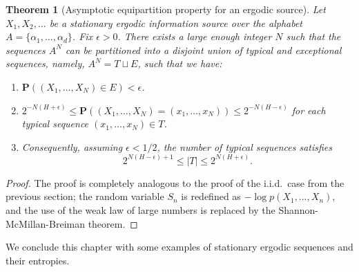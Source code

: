 \documentclass[12pt]{article}
\newtheorem{thm}{Theorem}[section]
\newcommand{\prob}{\mathbf{P}}
\theoremstyle{example}
\begin{document}
\begin{thm}[Asymptotic equipartition property for an ergodic source]
Let $X_1,X_2,\ldots$ be a stationary ergodic information source over the alphabet $A=\{\alpha_1,\ldots,\alpha_d\}$. Fix $\epsilon>0$. There exists a large enough integer $N$ such that the sequences $A^N$ can be partitioned into a disjoint union of typical and exceptional sequences, namely, $A^N = T \sqcup E$, such that we have:
\begin{enumerate}
\item $\prob((X_1,\ldots,X_N) \in E) < \epsilon$.
\item $2^{-N\left(H + \epsilon\right)} \le 
\prob((X_1,\ldots,X_N)=(x_1,\ldots,x_N)) \le 
2^{-N\left(H - \epsilon\right)}$ for each typical sequence $(x_1,\ldots,x_N)\in T$.
\item Consequently, assuming $\epsilon<1/2$, the number of typical sequences satisfies
$$
2^{N (H-\epsilon)+1} \le |T| \le 2^{N (H+\epsilon)}.
$$
\end{enumerate}
\end{thm}

\begin{proof} The proof is completely analogous to the proof of the i.i.d.\ case from the previous section; the random variable $S_n$ is redefined as $-\log p(X_1,\ldots,X_n)$, and the use of the weak law of large numbers is replaced by the Shannon-McMillan-Breiman theorem.
\end{proof}

We conclude this chapter with some examples of stationary ergodic sequences and their entropies.
\end{document}
